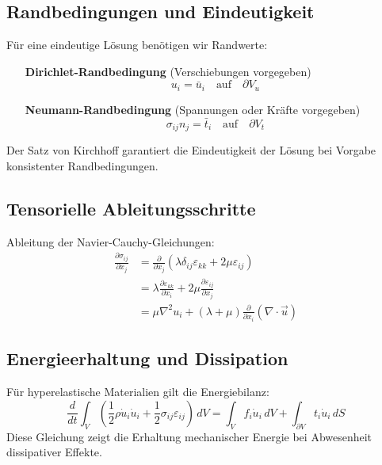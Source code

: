 \begin{description}
	\subsection{Randbedingungen und Eindeutigkeit}
	Für eine eindeutige Lösung benötigen wir Randwerte:
	\begin{enumerate}
		\item[\textbf{Dirichlet-Randbedingung}] (Verschiebungen vorgegeben)
		\begin{equation}
			u_i = 
			\bar{u}_i \quad \text{auf} \quad \partial V_u
		\end{equation}
		\item[\textbf{Neumann-Randbedingung}] (Spannungen oder Kräfte vorgegeben)
		\begin{equation}
			\sigma_{ij} n_j = 
			\bar{t}_i \quad \text{auf} \quad \partial V_t
		\end{equation}		
	\end{enumerate}
	Der Satz von Kirchhoff garantiert die Eindeutigkeit der Lösung bei Vorgabe konsistenter Randbedingungen.
	
	\subsection{Tensorielle Ableitungsschritte}
	Ableitung der Navier-Cauchy-Gleichungen:
	\begin{align}
		\frac{\partial \sigma_{ij}}{\partial x_j}& = 
		\frac{\partial}{\partial x_j} \left( \lambda \delta_{ij} \varepsilon_{kk} + 2\mu \varepsilon_{ij} \right)
		\\
		&= \lambda \frac{\partial \varepsilon_{kk}}{\partial x_i} + 2\mu \frac{\partial \varepsilon_{ij}}{\partial x_j}
		\\
		&= \mu \nabla^2 u_i + (\lambda + \mu) \frac{\partial}{\partial x_i} (\nabla \cdot \vec{u})
	\end{align}
	
	\subsection{Energieerhaltung und Dissipation}
	Für hyperelastische Materialien gilt die Energiebilanz:
	\begin{equation}
		\frac{d}{dt} \int_V \left( \frac{1}{2} \rho \dot{u}_i \dot{u}_i + \frac{1}{2} \sigma_{ij} \varepsilon_{ij} \right) \, dV = 
		\int_V f_i \dot{u}_i \, dV + \int_{\partial V} t_i \dot{u}_i \, dS
	\end{equation}
	Diese Gleichung zeigt die Erhaltung mechanischer Energie bei Abwesenheit dissipativer Effekte.
	

\end{description}
